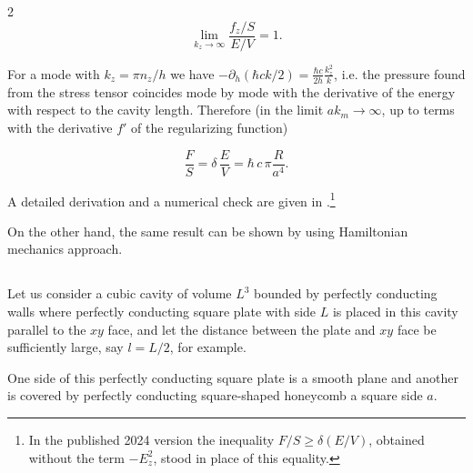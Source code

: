 \documentclass[twoside, 10pt]{article}
\def\myvspacebeforesubsection{-2.0mm}
\def\myvspaceaftersubsection{-2.5mm}
\begin{document}
\begin{multicols}{2}
\begin{equation}\lim_{k_z \to \infty}\frac{f_z/S}{E/V} = 1.\end{equation}

For a mode with \(k_z=\pi n_z/h\) we have
\(-\partial_h(\hbar ck/2)=\frac{\hbar c}{2h}\frac{k_z^2}{k}\), i.e. the pressure found from the
stress tensor coincides mode by mode with the derivative of the energy with respect to the cavity
length. Therefore (in the limit \(ak_m\to\infty\), up to terms with the derivative \(f'\) of the
regularizing function)

\begin{equation}\frac{F}{S} = \delta\,\frac{E}{V} = \hbar\,c\, \pi\frac{R}{a^4}.\end{equation}

A detailed derivation and a numerical check are given in \cite{Drozdov2026Noether, VerifNotebook}.\footnote{In the published 2024 version the inequality \(F/S\ge\delta(E/V)\), obtained without the term \(-E_z^2\), stood in place of this equality.}

On the other hand, the same result can be shown by using
Hamiltonian mechanics approach.


\vspace{\myvspacebeforesubsection}
    \subsection*{} \label{appendix-c.-hamiltonian-mechanics-approach}
\vspace{\myvspaceaftersubsection}


\setcounter{equation}{0}
\renewcommand{\theequation}{C.\arabic{equation}}

    Let us consider a cubic cavity of volume \(L^3\) bounded by perfectly
conducting walls where perfectly conducting square plate with side
\(L\) is placed in this cavity parallel to the \(xy\) face, and let the distance
between the plate and \(xy\) face be sufficiently large, say \(l = L/2\), for example.

One side of this perfectly conducting square plate is a smooth plane and
another is covered by perfectly conducting square-shaped honeycomb a square side \(a\).


\end{multicols}
\end{document}
